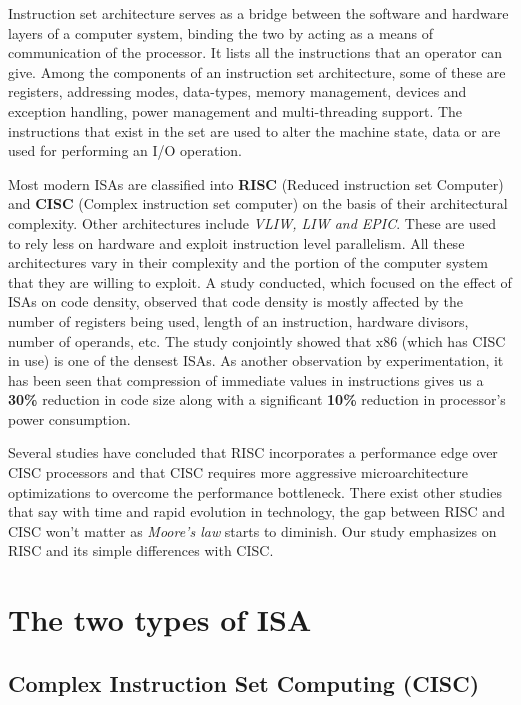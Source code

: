 \documentclass[conference]{IEEEtran}
\begin{document}
Instruction set architecture serves as a bridge between the software and hardware layers of a computer system, binding the two by acting as a means of communication of the processor. It lists all the instructions that an operator can give. Among the components of an instruction set architecture, some of these are registers, addressing modes, data-types, memory management, devices and exception handling, power management and multi-threading support. The instructions that exist in the set are used to alter the machine state, data or are used for performing an I/O operation.

Most modern ISAs are classified into \textbf{RISC} (Reduced instruction set Computer) and \textbf{CISC} (Complex instruction set computer) on the basis of their architectural complexity.  Other architectures include \textit{VLIW, LIW and EPIC}. These are used to rely less on hardware and exploit instruction level parallelism. All these architectures vary in their complexity and the portion of the computer system that they are willing to exploit.
A study conducted, which focused on the effect of ISAs on code density, observed that code density is mostly affected by the number of registers being used, length of an instruction, hardware divisors, number of operands, etc. The study conjointly showed that x86 (which has CISC in use) is one of the densest ISAs. As another observation by experimentation, it has been seen that compression of immediate values in instructions gives us a \textbf{30\%} reduction in code size along with a significant \textbf{10\%} reduction in processor’s power consumption.

Several studies have concluded that RISC incorporates a performance edge over CISC processors and that CISC requires more aggressive microarchitecture optimizations to overcome the performance bottleneck. There exist other studies that say with time and rapid evolution in technology, the gap between RISC and CISC won’t matter as \textit{Moore’s law} starts to diminish.
Our study emphasizes on RISC and its simple differences with CISC. 


\section{The two types of ISA}

\subsection{Complex Instruction Set Computing (CISC)}
\end{document}
